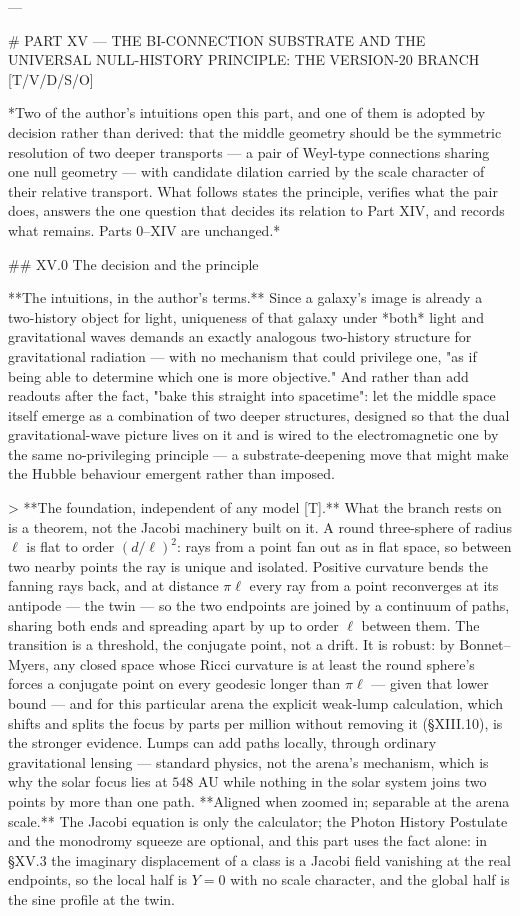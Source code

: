 ---

# PART XV — THE BI-CONNECTION SUBSTRATE AND THE UNIVERSAL NULL-HISTORY PRINCIPLE: THE VERSION-20 BRANCH [T/V/D/S/O]

*Two of the author's intuitions open this part, and one of them is adopted by decision rather than derived: that the middle geometry should be the symmetric resolution of two deeper transports — a pair of Weyl-type connections sharing one null geometry — with candidate dilation carried by the scale character of their relative transport. What follows states the principle, verifies what the pair does, answers the one question that decides its relation to Part XIV, and records what remains. Parts 0–XIV are unchanged.*

## XV.0 The decision and the principle

**The intuitions, in the author's terms.** Since a galaxy's image is already a two-history object for light, uniqueness of that galaxy under *both* light and gravitational waves demands an exactly analogous two-history structure for gravitational radiation — with no mechanism that could privilege one, "as if being able to determine which one is more objective." And rather than add readouts after the fact, "bake this straight into spacetime": let the middle space itself emerge as a combination of two deeper structures, designed so that the dual gravitational-wave picture lives on it and is wired to the electromagnetic one by the same no-privileging principle — a substrate-deepening move that might make the Hubble behaviour emergent rather than imposed.

> **The foundation, independent of any model [T].** What the branch rests on is a theorem, not the Jacobi machinery built on it. A round three-sphere of radius $\ell$ is flat to order $(d/\ell)^2$: rays from a point fan out as in flat space, so between two nearby points the ray is unique and isolated. Positive curvature bends the fanning rays back, and at distance $\pi\ell$ every ray from a point reconverges at its antipode — the twin — so the two endpoints are joined by a continuum of paths, sharing both ends and spreading apart by up to order $\ell$ between them. The transition is a threshold, the conjugate point, not a drift. It is robust: by Bonnet–Myers, any closed space whose Ricci curvature is at least the round sphere's forces a conjugate point on every geodesic longer than $\pi\ell$ — given that lower bound — and for this particular arena the explicit weak-lump calculation, which shifts and splits the focus by parts per million without removing it (§XIII.10), is the stronger evidence. Lumps can add paths locally, through ordinary gravitational lensing — standard physics, not the arena's mechanism, which is why the solar focus lies at $548$ AU while nothing in the solar system joins two points by more than one path. **Aligned when zoomed in; separable at the arena scale.** The Jacobi equation is only the calculator; the Photon History Postulate and the monodromy squeeze are optional, and this part uses the fact alone: in §XV.3 the imaginary displacement of a class is a Jacobi field vanishing at the real endpoints, so the local half is $Y = 0$ with no scale character, and the global half is the sine profile at the twin.

